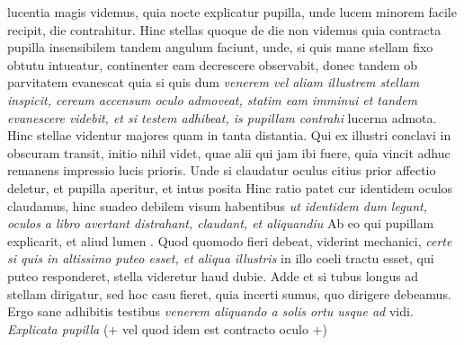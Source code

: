  \hspace{-1.2mm} lucentia magis videmus, quia nocte explicatur pupilla, unde lucem minorem facile recipit, die contrahitur. Hinc stellas\protect{} quoque de die non videmus quia contracta pupilla insensibilem tandem angulum faciunt, unde, si quis mane stellam fixo obtutu intueatur, continenter eam decrescere observabit, donec tandem ob parvitatem evanescat quia si quis dum \textit{venerem vel aliam illustrem stellam inspicit, cereum accensum oculo admoveat, statim eam imminui et tandem evanescere videbit, et si testem adhibeat, is pupillam\protect{} contrahi } lucerna admota. Hinc stellae videntur majores quam in tanta distantia. Qui ex illustri conclavi in obscuram transit, initio nihil videt, quae alii qui jam ibi fuere, quia vincit adhuc remanens impressio lucis prioris. Unde si claudatur oculus citius prior affectio deletur, et pupilla aperitur, et intus posita  Hinc ratio patet cur identidem oculos claudamus, hinc suadeo debilem visum habentibus \textit{ut identidem dum legunt, oculos a libro avertant distrahant, claudant, et aliquandiu } Ab eo qui pupillam explicarit, et aliud lumen . Quod quomodo fieri debeat, viderint mechanici\protect{}, 
\textit{certe si quis in altissimo puteo esset, et aliqua illustris } in illo coeli tractu esset, qui puteo responderet, stella videretur haud dubie. Adde et si tubus longus ad stellam dirigatur, sed hoc casu fieret, quia incerti sumus, quo dirigere debeamus. Ergo sane adhibitis testibus 
\textit{venerem aliquando a solis ortu usque ad } vidi. 
\textit{Explicata pupilla} (+ vel quod idem est contracto oculo +)
